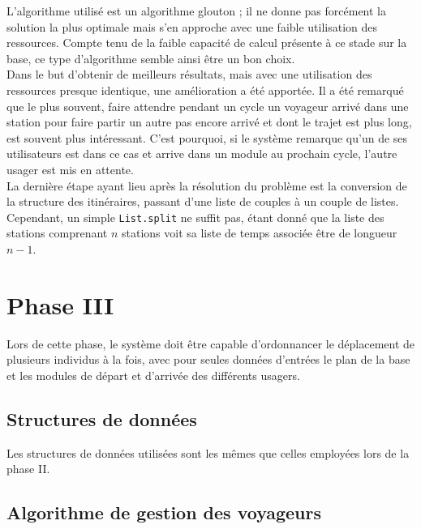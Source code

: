 \documentclass[11pt, a4paper, twoside, titlepage]{article}
\begin{document}
L'algorithme utilisé est un algorithme glouton ; il ne donne pas forcément la solution la plus optimale mais s'en approche avec une faible utilisation des ressources. Compte tenu de la faible capacité de calcul présente à ce stade sur la base, ce type d'algorithme semble ainsi être un bon choix.\\
Dans le but d'obtenir de meilleurs résultats, mais avec une utilisation des ressources presque identique, une amélioration a été apportée. Il a été remarqué que le plus souvent, faire attendre pendant un cycle un voyageur arrivé dans une station pour faire partir un autre pas encore arrivé et dont le trajet est plus long, est souvent plus intéressant. C'est pourquoi, si le système remarque qu'un de ses utilisateurs est dans ce cas et arrive dans un module au prochain cycle, l'autre usager est mis en attente.\\

La dernière étape ayant lieu après la résolution du problème est la conversion de la structure des itinéraires, passant d'une liste de couples à un couple de listes. Cependant, un simple \texttt{List.split} ne suffit pas, étant donné que la liste des stations comprenant $n$ stations voit sa liste de temps associée être de longueur $n-1$.\\

\clearpage

\section{Phase III}

Lors de cette phase, le système doit être capable d'ordonnancer le déplacement de plusieurs individus à la fois, avec pour seules données d'entrées le plan de la base et les modules de départ et d'arrivée des différents usagers.\\


\subsection{Structures de données}

Les structures de données utilisées sont les mêmes que celles employées lors de la phase II.\\

\subsection{Algorithme de gestion des voyageurs}
\end{document}
